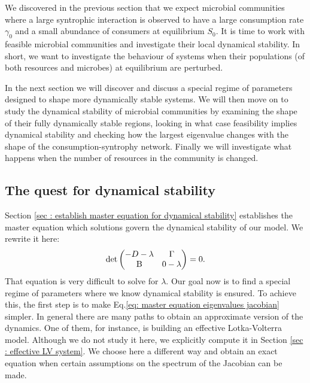 \documentclass[12pt, titlepage]{report}
\begin{document}
We discovered in the previous section that we expect microbial communities where a large syntrophic interaction is observed to have a large consumption rate $\gamma_0$ and a small abundance of consumers at equilibrium $S_0$. It is time to work with feasible microbial communities and investigate their local dynamical stability. In short, we want to investigate the behaviour of systems when their populations (of both resources and microbes) at equilibrium are perturbed.

In the next section we will discover and discuss a special regime of parameters designed to shape more dynamically stable systems. We will then move on to study the dynamical stability of microbial communities by examining the shape of their fully dynamically stable regions, looking in what case feasibility implies dynamical stability and checking how the largest eigenvalue changes with the shape of the consumption-syntrophy network. Finally we will investigate what happens when the number of resources in the community is changed.

\subsection{The quest for dynamical stability}
Section \ref{sec : establish master equation for dynamical stability} establishes the master equation
which solutions govern the dynamical stability of our model. We rewrite it here:
\begin{equation}
\det
\begin{pmatrix}
 -D - \lambda  & \Gamma \\
 \text{B} & 0-\lambda
\end{pmatrix} = 0.
\label{eq: master equation eigenvalues jacobian}
\end{equation}
That equation is very difficult to solve for $\lambda$. Our goal now is to find a special regime of parameters where we know dynamical stability is ensured. To achieve this, the first step is to make Eq.\eqref{eq: master equation eigenvalues jacobian} simpler.
In general there are many paths to obtain an approximate version of the dynamics. One of them, for instance, is building an effective Lotka-Volterra model. Although we do not study it here, we explicitly compute it in Section \ref{sec : effective LV system}. We choose here a different way and obtain an exact equation when certain assumptions on the spectrum of the Jacobian can be made.
\end{document}
